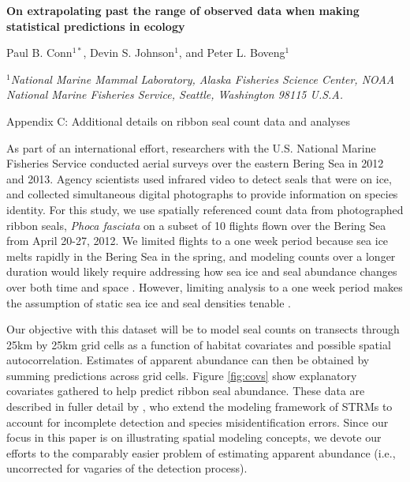 \documentclass[12pt,fleqn]{article}
\begin{document}
\begin{center} \bf {\large On extrapolating past the range of observed data when making statistical predictions in ecology}

\vspace{0.7cm}
Paul B. Conn$^{1*}$, Devin S. Johnson$^1$, and Peter L. Boveng$^1$
\end{center}
\vspace{0.5cm}

\rm
\small

\it $^1$National Marine Mammal Laboratory, Alaska Fisheries Science Center,
NOAA National Marine Fisheries Service,
Seattle, Washington 98115 U.S.A.\\

\rm \begin{flushleft}

\raggedbottom
\vspace{.5in}

\begin{center}
Appendix C: Additional details on ribbon seal count data and analyses
\bigskip
\end{center}
\vspace{.3in}

\doublespacing


As part of an international effort, researchers with the U.S. National Marine Fisheries Service conducted aerial surveys over the eastern Bering Sea in 2012 and 2013.  Agency scientists used infrared video to detect seals that were on ice, and collected simultaneous digital photographs to provide information on species identity. For this study, we use spatially referenced count data from photographed ribbon seals, {\it Phoca fasciata} on a subset of 10 flights flown over the Bering Sea from April 20-27, 2012.  We limited flights to a one week period because sea ice melts rapidly in the Bering Sea in the spring, and modeling counts over a longer duration would likely require addressing how sea ice and seal abundance changes over both time and space \citep[see][]{ConnEtAl2015}. However, limiting analysis to a one week period makes the assumption of static sea ice and seal densities tenable \citep{ConnEtAl2014}.

\hspace{.5in} Our objective with this dataset will be to model seal counts on transects through 25km by 25km grid cells as a function of habitat covariates and possible spatial autocorrelation. Estimates of apparent abundance can then be obtained by summing predictions across grid cells. Figure \ref{fig:covs} show explanatory covariates gathered to help predict ribbon seal abundance.  These data are described in fuller detail by \citet{ConnEtAl2014}, who extend the modeling framework of STRMs to account for incomplete detection and species misidentification errors.  Since our focus in this paper is on illustrating spatial modeling concepts, we devote our efforts to the comparably easier problem of estimating apparent abundance (i.e., uncorrected for vagaries of the detection process).



\end{flushleft}
\end{document}
